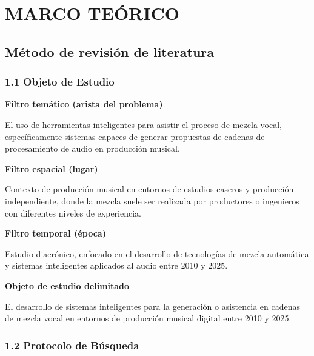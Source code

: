 \documentclass[12pt]{article}
\begin{document}

\section{MARCO TEÓRICO}

\subsection*{Método de revisión de literatura}

\subsubsection*{1.1 Objeto de Estudio}

\textbf{Filtro temático (arista del problema)}

El uso de herramientas inteligentes para asistir el proceso de mezcla vocal, específicamente sistemas capaces de generar propuestas de cadenas de procesamiento de audio en producción musical.

\textbf{Filtro espacial (lugar)}

Contexto de producción musical en entornos de estudios caseros y producción independiente, donde la mezcla suele ser realizada por productores o ingenieros con diferentes niveles de experiencia.

\textbf{Filtro temporal (época)}

Estudio diacrónico, enfocado en el desarrollo de tecnologías de mezcla automática y sistemas inteligentes aplicados al audio entre 2010 y 2025.

\textbf{Objeto de estudio delimitado}

El desarrollo de sistemas inteligentes para la generación o asistencia en cadenas de mezcla vocal en entornos de producción musical digital entre 2010 y 2025.

\subsubsection*{1.2 Protocolo de Búsqueda}
\end{document}

